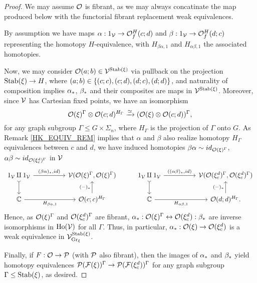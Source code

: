\documentclass[a4paper,10pt
,draft
]{article}%
\renewcommand{\F}{\mathcal F}
\renewcommand{\1}{\ensuremath{\mathbb{id}}}
\begin{document}
\begin{proof}
      We may assume $\O$ is fibrant, as we may always concatinate the map produced below with the functorial fibrant replacement weak equivalences.
      
      By assumption we have maps
      $\alpha: 1_\V \to \O^H_f(c;d)$ and $\beta: 1_\V \to \O^H_f(d;c)$
      representing the homotopy $H$-equivalence,
      with $H_{\beta\alpha,1}$ and $H_{\alpha\beta,1}$ the associated homotopies. 

      Now, we may consider $\O(a;b) \in \V^{\Stab(\ksi)}$ via pullback on the projection $\Stab(\ksi) \to H$,
      where $(a;b) \in \set{(c;c), (c;d), (d;c), (d;d)}$,
      and naturality of composition implies
      $\alpha_{\**}$, $\beta_{\**}$ and their composites are maps in $\V^{\Stab(\ksi)}$.
      Moreover, since $\V$ has Cartesian fixed points,
      we have an isomorphism 
      \begin{equation}
            \O(\ksi)^\Gamma \otimes \O(c;d)^{H_\Gamma} \xrightarrow{\simeq} 
            (\O(\ksi) \otimes \O(c;d))^\Gamma,
      \end{equation}
      for any graph subgroup $\Gamma \leq G \times \Sigma_n$,
      where $H_\Gamma$ is the projection of $\Gamma$ onto $G$.
      As Remark \ref{HK_EQUIV_REM} implies that $\alpha$ and $\beta$ also realize homotopy $H_\Gamma$ equivalences between $c$ and $d$,
      we have induced homotopies $\beta\alpha \sim id_{\O(\ksi)^{\Gamma}}$, $\alpha\beta \sim id_{\O(\ksi_c^d)^\Gamma}$ in $\V$
      \begin{equation}
            \begin{tikzcd}
                  1_\V \amalg 1_\V \arrow[d, tail] \arrow[rr, "{(\beta\alpha)_{\**}, id)}"]
                  &&
                  \V(\O(\ksi)^\Gamma, \O(\ksi)^\Gamma)
                  &
                  1_\V \amalg 1_\V \arrow[d, tail] \arrow[rr, "{((\alpha\beta)_{\**}, id)}"]
                  &&
                  \V(\O(\ksi_c^d)^\Gamma, \O(\ksi_c^d)^\Gamma)
                  \\
                  \mathbb C \arrow[rr, "H_{\beta\alpha,1}"']
                  &&
                  \O(c;c)^{H_\Gamma} \arrow[u, "{(-)_{\**}}"]
                  &
                  \mathbb C \arrow[rr, "H_{\alpha\beta,1}"']
                  &&
                  \O(d;d)^{H_\Gamma} \arrow[u, "{(-)_{\**}}"].
            \end{tikzcd}
      \end{equation}
      Hence, as $\O(\ksi)^\Gamma$ and $\O(\ksi_c^d)^\Gamma$ are fibrant,
      $\alpha_{\**}: \O(\ksi)^\Gamma \leftrightarrow \O(\ksi_c^d) : \beta_{\**}$ are inverse isomorphisms in $\Ho(\V)$ for all $\Gamma$.
      Thus, in particular, $\alpha_{\**}: \O(\ksi) \to \O(\ksi_c^d)$ is a weak equivalence in $\V^{\Stab(\ksi)}_{\mathrm{Gr}_\ksi}$.

      Finally, if $F: \O \to \P$ (with $\P$ also fibrant),
      then the images of $\alpha_{\**}$ and $\beta_{\**}$ yield
      homotopy equivalences $\P(\F(\ksi))^\Gamma \to \P(\F(\ksi_c^d))^\Gamma$ for any graph subgroup $\Gamma \leq \Stab(\ksi)$,
      as desired.
\end{proof}
\end{document}
